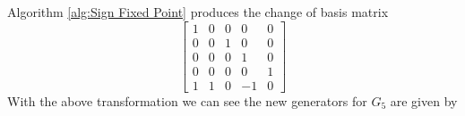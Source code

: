 \documentclass{article}
\theoremstyle{plain}
\theoremstyle{definition}
\newcommand{\tand}{\ensuremath{\,\,\, \text{and} \,\,\,}}
\begin{document}
%
Algorithm \ref{alg:Sign Fixed Point} produces the change of basis matrix 
$$
 \left[ \begin {array}{ccccc} 1&0&0&0&0\\ 0&0&1&0&0
\\ 0&0&0&1&0\\ 0&0&0&0&1
\\ 1&1&0&-1&0\end {array} \right]
$$
With the above transformation we can see the new generators for $G_5$ are given by 
\end{document}
